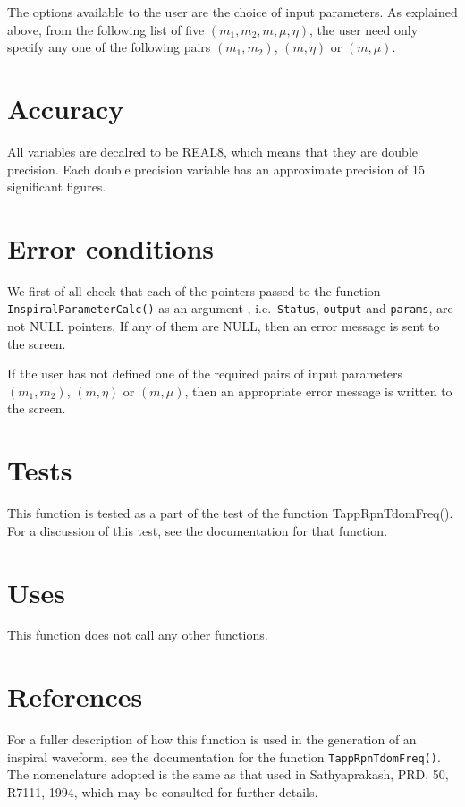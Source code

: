 \documentclass[12pt]{article}
\begin{document}
The options available to the user are the choice of input parameters. As explained above, from the following list of five $(m_{1},m_{2},m,\mu,\eta)$, the user need only specify any one of the following pairs $(m_{1},m_{2})$, $(m,\eta)$ or $(m,\mu)$. 

\section{Accuracy}

All variables are decalred to be REAL8, which means that they are double precision.
Each double precision variable has an approximate precision of 15 significant figures.



\section{Error conditions}

We first of all check that each of the pointers passed to the function \\ \texttt{InspiralParameterCalc()} as an argument , i.e.\ \texttt{Status}, \texttt{output} and \texttt{params}, are not NULL pointers. If any of them are NULL, then an error message is sent to the screen.

If the user has not defined one of the required pairs of input parameters $(m_{1},m_{2})$, $(m,\eta)$ or $(m,\mu)$, then an appropriate error message is written to the screen.



\section{Tests}

This function is tested as a part of the test of the function TappRpnTdomFreq(). For a discussion of this test, see the documentation for that function.

\section{Uses}

This function does not call any other functions.


\section{References}
For a fuller description of how this function is used in the generation of an inspiral waveform, see the documentation for the function \texttt{TappRpnTdomFreq()}.
The nomenclature adopted is the same as that used in Sathyaprakash, PRD, 50, R7111, 1994, which may be consulted for further details.
\end{document}
